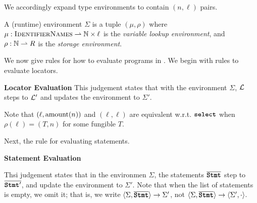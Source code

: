 \documentclass[nonacm, dvipsnames, sigconf]{acmart}
\begin{document}
We accordingly expand type environments to contain $(n, \ell)$ pairs.

\begin{definition}
    A (runtime) environment $\Sigma$ is a tuple $(\mu, \rho)$ where $\mu : \textsc{IdentifierNames} \partialfunc \mathbb{N} \times \ell$ is the \emph{variable lookup environment}, and $\rho : \mathbb{N} \partialfunc R$ is the \emph{storage environment}.
\end{definition}

We now give rules for how to evaluate programs in \langName.
We begin with rules to evaluate locators.

 \textbf{Locator Evaluation}
This judgement states that with the environment $\Sigma$, $\Loc$ steps to $\Loc'$ and updates the environment to $\Sigma'$.

Note that $(\ell, \amount(n))$ and $(\ell, \ell)$ are equivalent w.r.t. $\select$ when $\rho(\ell) = (T, n)$ for some fungible $T$.

\begin{mathpar}




\end{mathpar}

Next, the rule for evaluating statements.

 \textbf{Statement Evaluation}

Thsi judgement states that in the environmen $\Sigma$, the statements $\overline{\Stmt}$ step to $\overline{\Stmt'}$, and update the environment to $\Sigma'$.
Note that when the list of statements is empty, we omit it; that is, we write $\angles{\Sigma, \overline{\Stmt}} \to \Sigma'$, not $\angles{\Sigma, \overline{\Stmt}} \to \angles{\Sigma', \cdot}$.
\end{document}
